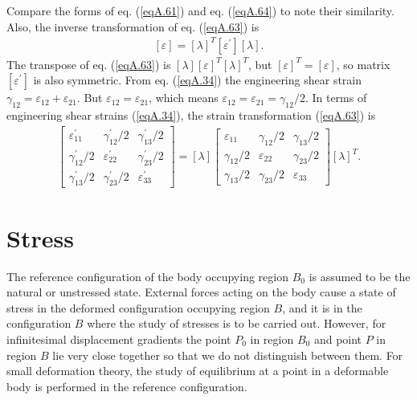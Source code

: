 \documentclass{AeroStructure-ERJohnson}
\begin{document}
Compare the forms of eq. (\ref{eqA.61}) and eq. (\ref{eqA.64}) to note their similarity. Also, the inverse transformation of eq. (\ref{eqA.63}) is
\begin{align}\label{eqA.65}
[\varepsilon]=[\lambda]^{T}[\varepsilon^{\prime}][\lambda].
\end{align}
The transpose of eq. (\ref{eqA.63}) is $[\lambda][\varepsilon]^{T}[\lambda]^{T}$, but $[\varepsilon]^{T}=[\varepsilon]$, so matrix $[\varepsilon^{\prime}]$ is also symmetric. From eq. (\ref{eqA.34}) the engineering shear strain $\gamma_{12}=\varepsilon_{12}+\varepsilon_{21}$. But $\varepsilon_{12}=\varepsilon_{21}$, which means $\varepsilon_{12}=\varepsilon_{21}=\gamma_{12} / 2$. In terms of engineering shear strains (\ref{eqA.34}), the strain transformation (\ref{eqA.63}) is
\begin{align}\label{eqA.66}
\left[\begin{array}{ccc}\varepsilon_{11}^{\prime} & \gamma_{12}^{\prime} / 2 & \gamma_{13}^{\prime} / 2 \\[4pt]
\gamma_{12}^{\prime} / 2 & \varepsilon_{22}^{\prime} & \gamma_{23}^{\prime} / 2 \\[4pt]
\gamma_{13}^{\prime} / 2 & \gamma_{23}^{\prime} / 2 & \varepsilon_{33}^{\prime}\end{array}\right]=[\lambda]\left[\begin{array}{ccc}
\varepsilon_{11} & \gamma_{12} / 2 & \gamma_{13} / 2 \\
\gamma_{12} / 2 & \varepsilon_{22} & \gamma_{23} / 2 \\
\gamma_{13} / 2 & \gamma_{23} / 2 & \varepsilon_{33}
\end{array}\right][\lambda]^{T}.
\end{align}

\section{Stress}\label{secA.2}

The reference configuration of the body occupying region $B_{0}$ is assumed to be the natural or unstressed state. External forces acting on the body cause a state of stress in the deformed configuration occupying region $B$, and it is in the configuration $B$ where the study of stresses is to be carried out. However, for infinitesimal displacement gradients the point $P_{0}$ in region $B_{0}$ and point $P$ in region $B$ lie very close together so that we do not distinguish between them. For small deformation theory, the study of equilibrium at a point in a deformable body is performed in the reference configuration.
\end{document}
